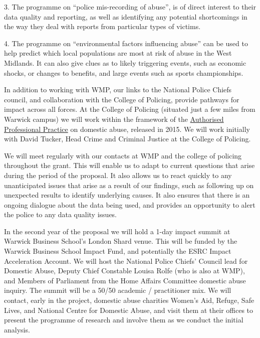 \documentclass[11pt, a4paper]{article}
\begin{document}
3. The programme on ``police mis-recording of abuse'', is of direct interest to their data quality and reporting, as well as identifying any potential shortcomings in the way they deal with reports from particular types of victims. 

4. The programme on ``environmental factors influencing abuse'' can be used to help predict which local populations are most at risk of abuse in the West Midlands. It can also give clues as to likely triggering events, such as economic shocks, or changes to benefits, and large events such as sports championships.

In addition to working with WMP, our links to the National Police Chiefs council, and collaboration with the College of Policing, provide pathways for impact across all forces. At the College of Policing (situated just a few miles from Warwick campus) we will work within the framework of the \href{https://www.app.college.police.uk/app-content/major-investigation-and-public-protection/domestic-abuse/introduction/) and the revision of the existing DASH risk assessment tool for domestic abuse. (https://whatworks.college.police.uk/Research/Documents/DA_risk_assessment_pilot.pdf}{Authorised Professional Practice} on domestic abuse, released in 2015. We will work initially with David Tucker, Head Crime and Criminal Justice at the College of Policing.

We will meet regularly with our contacts at WMP and the college of policing throughout the grant. This will enable us to adapt to current questions that arise during the period of the proposal. It also allows us to react quickly to any unanticipated issues that arise as a result of our findings, such as following up on unexpected results to identify underlying causes. It also ensures that there is an ongoing dialogue about the data being used, and provides an opportunity to alert the police to any data quality issues.


In the second year of the proposal we will hold a 1-day impact summit at Warwick Business School's London Shard venue. This will be funded by the Warwick Business School Impact Fund, and potentially the ESRC Impact Acceleration Account. We will host the National Police Chiefs' Council lead for Domestic Abuse, Deputy Chief Constable Louisa Rolfe (who is also at WMP), and Members of Parliament from the Home Affairs Committee domestic abuse inquiry. The summit will be a 50/50 academic / practitioner mix. We will contact, early in the project, domestic abuse charities Women's Aid, Refuge, Safe Lives, and National Centre for Domestic Abuse, and visit them at their offices to present the programme of research and involve them as we conduct the initial analysis.
\end{document}
